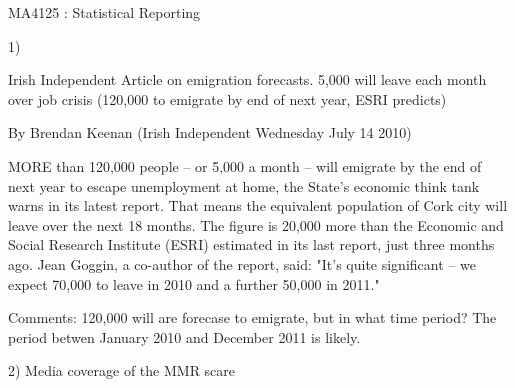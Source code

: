 MA4125 : Statistical Reporting

1) 

Irish Independent Article on emigration forecasts.
5,000 will leave each month over job crisis
(120,000 to emigrate by end of next year, ESRI predicts)

By Brendan Keenan (Irish Independent Wednesday July 14 2010)

MORE than 120,000 people -- or 5,000 a month -- will emigrate by the end of next year to escape unemployment at home, the State's economic think tank warns in its latest report.
That means the equivalent population of Cork city will leave over the next 18 months.
The figure is 20,000 more than the Economic and Social Research Institute (ESRI) estimated in its last report, just three months ago.
Jean Goggin, a co-author of the report, said: "It's quite significant -- we expect 70,000 to leave in 2010 and a further 50,000 in 2011."


Comments:
120,000 will are  forecase to emigrate, but in what time period? The period betwen January 2010 and December 2011 is likely.

2) Media coverage of the MMR scare
